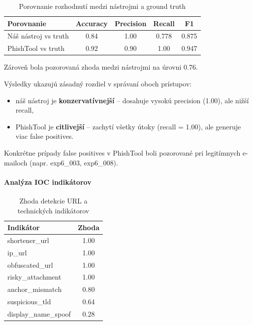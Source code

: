 \documentclass[conference]{IEEEtran}
\begin{document}
\begin{table}[H]
\centering
\caption{Porovnanie rozhodnutí medzi nástrojmi a ground truth}
\begin{tabular}{lcccc}
\hline
Porovnanie & Accuracy & Precision & Recall & F1 \\
\hline
Náš nástroj vs truth & 0.84 & 1.00 & 0.778 & 0.875 \\
PhishTool vs truth & 0.92 & 0.90 & 1.00 & 0.947 \\
\hline
\end{tabular}

\end{table}

Zároveň bola pozorovaná zhoda medzi nástrojmi na úrovni 0.76.

Výsledky ukazujú zásadný rozdiel v správaní oboch prístupov:

\begin{itemize}
    \item náš nástroj je \textbf{konzervatívnejší} – dosahuje vysokú precision (1.00),
    ale nižší recall,
    \item PhishTool je \textbf{citlivejší} – zachytí všetky útoky (recall = 1.00),
    ale generuje viac false positives.
\end{itemize}

Konkrétne prípady false positives v PhishTool boli pozorované
pri legitímnych e-mailoch (napr. exp6\_003, exp6\_008).

\paragraph{Analýza IOC indikátorov}

\begin{table}[H]
\centering
\caption{Zhoda detekcie URL a technických indikátorov}
\begin{tabular}{lc}
\hline
Indikátor & Zhoda \\
\hline
shortener\_url & 1.00 \\
ip\_url & 1.00 \\
obfuscated\_url & 1.00 \\
risky\_attachment & 1.00 \\
anchor\_mismatch & 0.80 \\
suspicious\_tld & 0.64 \\
display\_name\_spoof & 0.28 \\
\hline
\end{tabular}
\end{table}
\end{document}
